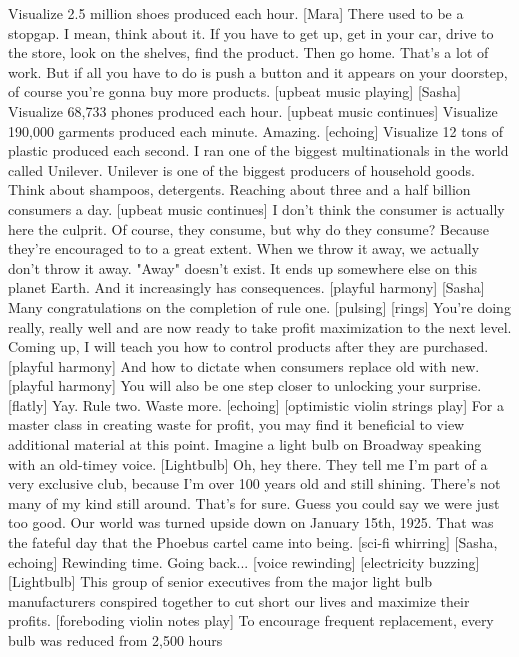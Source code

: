 \documentclass[a4paper]{article}
\begin{document}
	Visualize 2.5 million shoes produced each hour.
	[Mara] There used to be a stopgap.
	I mean, think about it.
	If you have to get up, get in your car,
	drive to the store,
	look on the shelves, find the product.
	Then go home.
	That's a lot of work.
	But if all you have to do is push a button
	and it appears on your doorstep,
	of course you're gonna buy more products.
	[upbeat music playing]
	[Sasha] Visualize 68,733 phones produced each hour.
	[upbeat music continues]
	Visualize 190,000 garments produced each minute.
	Amazing. [echoing]
	Visualize 12 tons of plastic produced each second.
	I ran one of the biggest multinationals in the world called Unilever.
	Unilever is one of the biggest producers
	of household goods.
	Think about shampoos, detergents.
	Reaching about three and a half billion consumers a day.
	[upbeat music continues]
	I don't think the consumer is actually here the culprit.
	Of course, they consume, but why do they consume?
	Because they're encouraged to to a great extent.
	When we throw it away, we actually don't throw it away.
	"Away" doesn't exist.
	It ends up somewhere else on this planet Earth.
	And it increasingly has consequences.
	[playful harmony]
	[Sasha] Many congratulations on the completion of rule one.
	[pulsing]
	[rings]
	You're doing really, really well
	and are now ready to take profit maximization to the next level.
	Coming up,
	I will teach you how to control products after they are purchased.
	[playful harmony]
	And how to dictate when consumers replace old with new.
	[playful harmony]
	You will also be one step closer to unlocking your surprise.
	[flatly] Yay.
	Rule two.
	Waste more. [echoing]
	[optimistic violin strings play]
	For a master class in creating waste for profit,
	you may find it beneficial to view additional material at this point.
	Imagine a light bulb on Broadway speaking with an old-timey voice.
	[Lightbulb] Oh, hey there.
	They tell me I'm part of a very exclusive club,
	because I'm over 100 years old and still shining.
	There's not many of my kind still around. That's for sure.
	Guess you could say we were just too good.
	Our world was turned upside down on January 15th, 1925.
	That was the fateful day that the Phoebus cartel came into being.
	[sci-fi whirring]
	[Sasha, echoing] Rewinding time.
	Going back...
	[voice rewinding]
	[electricity buzzing]
	[Lightbulb] This group of senior executives
	from the major light bulb manufacturers
	conspired together to cut short our lives and maximize their profits.
	[foreboding violin notes play]
	To encourage frequent replacement,
	every bulb was reduced from 2,500 hours
\end{document}
